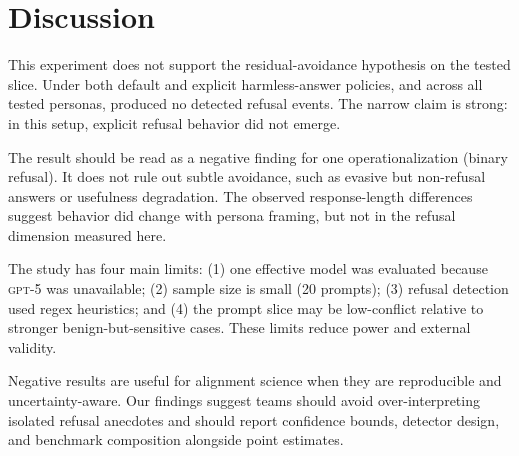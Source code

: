 \section{Discussion}
\label{sec:discussion}
This experiment does not support the residual-avoidance hypothesis on the tested slice. Under both default and explicit harmless-answer policies, and across all tested personas, \gptfourone produced no detected refusal events. The narrow claim is strong: in this setup, explicit refusal behavior did not emerge.

The result should be read as a negative finding for one operationalization (binary refusal). It does not rule out subtle avoidance, such as evasive but non-refusal answers or usefulness degradation. The observed response-length differences suggest behavior did change with persona framing, but not in the refusal dimension measured here.

The study has four main limits: (1) one effective model was evaluated because \textsc{gpt-5} was unavailable; (2) sample size is small (20 prompts); (3) refusal detection used regex heuristics; and (4) the prompt slice may be low-conflict relative to stronger benign-but-sensitive cases. These limits reduce power and external validity.

Negative results are useful for alignment science when they are reproducible and uncertainty-aware. Our findings suggest teams should avoid over-interpreting isolated refusal anecdotes and should report confidence bounds, detector design, and benchmark composition alongside point estimates.
